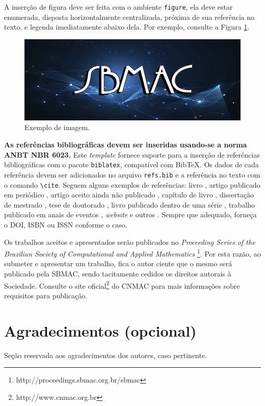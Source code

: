 \documentclass[a4,11pt]{pssbmac}
\begin{document}
A inserção de figura deve ser feita com o ambiente \verb!figure!, ela deve estar enumerada, disposta horizontalmente centralizada, próxima de sua referência no texto, e legenda imediatamente abaixo dela. Por exemplo, consulte a Figura \ref{figura01}.

\begin{figure}[H]
\centering
\includegraphics[width=.5\textwidth]{ex_fig}
\caption{ {\small Exemplo de imagem.}}
\label{figura01}
\end{figure}


{\bf As referências bibliográficas devem ser inseridas usando-se a norma ANBT NBR 6023.} Este {\it template} fornece suporte para a inserção de referências bibliográficas com o pacote \verb+biblatex+, compatível com BibTeX. Os dados de cada referência devem ser adicionados no arquivo \verb+refs.bib+ e a referência no texto com o comando \verb+\cite+. Seguem alguns exemplos de referências: livro \cite{Boldrini}, artigo publicado em periódico \cite{Cuminato}, artigo aceito ainda não publicado \cite{Contiero}, capítulo de livro \cite{daSilva}, dissertação de mestrado \cite{Diniz}, tese de doutorado \cite{Mallet}, livro publicado dentro de uma série \cite{Gomes}, trabalho publicado em anais de eventos \cite{Santos}, {\it website} e outros \cite{CNMAC}. Sempre que adequado, forneça o DOI, ISBN ou ISSN conforme o caso.

Os trabalhos aceitos e apresentados serão publicados no {\it Proceeding Series of the Brazilian Society of Computational and Applied Mathematics} \footnote{http://proceedings.sbmac.org.br/sbmac}. Por esta razão, ao submeter e apresentar um trabalho, fica o autor ciente que o mesmo será publicado pela SBMAC, sendo tacitamente cedidos os direitos autorais à Sociedade. Consulte o site oficial\footnote{http://www.cnmac.org.br} do CNMAC para mais informações sobre requisitos para publicação.

\section*{Agradecimentos (opcional)}
Seção reservada aos agradecimentos dos autores, caso pertinente. 

\printbibliography
\end{document}
